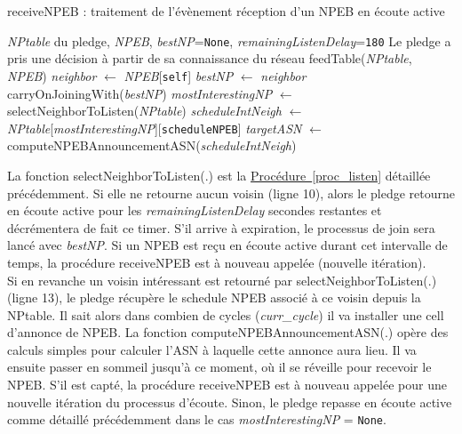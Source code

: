 \documentclass[]{report}
\newcommand{\wordlink}[2]{\hyperref[#2]{#1~\ref{#2}}}
\begin{document}
\newpage

\begin{algorithm}[!h]
\caption{receiveNPEB : traitement de l'évènement réception d'un NPEB en écoute active}
\begin{algorithmic}[1]
\Require \textit{NPtable} du pledge, \textit{NPEB}, \textit{bestNP}=\texttt{None}, \textit{remainingListenDelay}=\texttt{180}
\Ensure Le pledge a pris une décision à partir de sa connaissance du réseau
\State feedTable(\textit{NPtable}, \textit{NPEB})
\State \textit{neighbor} $\leftarrow$ \textit{NPEB}[\texttt{self}]
\State \textit{bestNP} $\leftarrow$ \textit{neighbor}
\EndIf
{}
\State carryOnJoiningWith(\textit{bestNP})
\Else
\State \textit{mostInterestingNP} $\leftarrow$ selectNeighborToListen(\textit{NPtable})
\Else
\State \textit{scheduleIntNeigh} $\leftarrow$ \textit{NPtable}[\textit{mostInterestingNP}][\texttt{scheduleNPEB}]
\State \textit{targetASN} $\leftarrow$ computeNPEBAnnouncementASN(\textit{scheduleIntNeigh})
\EndIf
\EndIf
\end{algorithmic}
\label{proc_iter}
\end{algorithm}

\vspace{0.2cm}


La fonction selectNeighborToListen(.) est la \wordlink{Procédure}{proc_listen} détaillée précédemment. Si elle ne retourne aucun voisin (ligne 10), alors le pledge retourne en écoute active pour les \textit{remainingListenDelay} secondes restantes et décrémentera de fait ce timer. S'il arrive à expiration, le processus de join sera lancé avec \textit{bestNP}. Si un NPEB est reçu en écoute active durant cet intervalle de temps, la procédure receiveNPEB est à nouveau appelée (nouvelle itération).\\

Si en revanche un voisin intéressant est retourné par selectNeighborToListen(.) (ligne 13), le pledge récupère le schedule NPEB associé à ce voisin depuis la NPtable. Il sait alors dans combien de cycles (\textit{curr\_cycle}) il va installer une cell d'annonce de NPEB. La fonction computeNPEBAnnouncementASN(.) opère des calculs simples pour calculer l'ASN à laquelle cette annonce aura lieu. Il va ensuite passer en sommeil jusqu'à ce moment, où il se réveille pour recevoir le NPEB. S'il est capté, la procédure receiveNPEB est à nouveau appelée pour une nouvelle itération du processus d'écoute. Sinon, le pledge repasse en écoute active comme détaillé précédemment dans le cas \textit{mostInterestingNP} = \texttt{None}.\\
\end{document}
